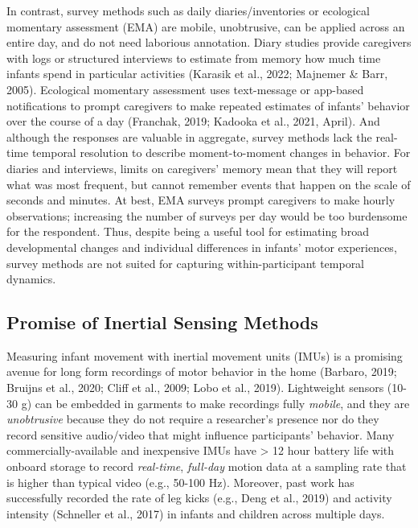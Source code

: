 \documentclass[
  man]{apa6}
\begin{document}
In contrast, survey methods such as daily diaries/inventories or ecological momentary assessment (EMA) are mobile, unobtrusive, can be applied across an entire day, and do not need laborious annotation. Diary studies provide caregivers with logs or structured interviews to estimate from memory how much time infants spend in particular activities (Karasik et al., 2022; Majnemer \& Barr, 2005). Ecological momentary assessment uses text-message or app-based notifications to prompt caregivers to make repeated estimates of infants' behavior over the course of a day (Franchak, 2019; Kadooka et al., 2021, April). And although the responses are valuable in aggregate, survey methods lack the real-time temporal resolution to describe moment-to-moment changes in behavior. For diaries and interviews, limits on caregivers' memory mean that they will report what was most frequent, but cannot remember events that happen on the scale of seconds and minutes. At best, EMA surveys prompt caregivers to make hourly observations; increasing the number of surveys per day would be too burdensome for the respondent. Thus, despite being a useful tool for estimating broad developmental changes and individual differences in infants' motor experiences, survey methods are not suited for capturing within-participant temporal dynamics.

\hypertarget{promise-of-inertial-sensing-methods}{%
\subsection{Promise of Inertial Sensing Methods}\label{promise-of-inertial-sensing-methods}}

Measuring infant movement with inertial movement units (IMUs) is a promising avenue for long form recordings of motor behavior in the home (Barbaro, 2019; Bruijns et al., 2020; Cliff et al., 2009; Lobo et al., 2019). Lightweight sensors (10-30 g) can be embedded in garments to make recordings fully \emph{mobile}, and they are \emph{unobtrusive} because they do not require a researcher's presence nor do they record sensitive audio/video that might influence participants' behavior. Many commercially-available and inexpensive IMUs have \textgreater{} 12 hour battery life with onboard storage to record \emph{real-time}, \emph{full-day} motion data at a sampling rate that is higher than typical video (e.g., 50-100 Hz). Moreover, past work has successfully recorded the rate of leg kicks (e.g., Deng et al., 2019) and activity intensity (Schneller et al., 2017) in infants and children across multiple days.
\end{document}
